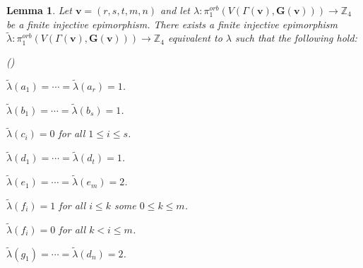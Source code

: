 \documentclass{amsart}
\newcounter{qcounter}
\newtheorem{lemma}[theorem]{Lemma}
\theoremstyle{definition}
\numberwithin{equation}{section}
\begin{document}
\begin{lemma}
Let ${\mathbf{v}}=(r,s,t,m,n)$ and let $\lambda:\pi_1^{orb}(V(\Gamma({\mathbf{v}}), {\mathbf{G(v)}}))\longrightarrow{\mathbb{Z}_{4}}$ be a finite injective epimorphism. There exists a finite injective epimorphism $\tilde{\lambda}:\pi_1^{orb}(V(\Gamma({\mathbf{v}}), {\mathbf{G(v)}}))\longrightarrow{\mathbb{Z}_{4}}$ equivalent to $\lambda$ such that the following hold:
\begin{list}{()~}{}
\item $\tilde{\lambda}(a_{1})=\cdots=\tilde{\lambda}(a_{r})=1$.
\item $\tilde{\lambda}(b_{1})=\cdots=\tilde{\lambda}(b_{s})=1$.
\item $\tilde{\lambda}(c_i)=0$ for all $1\leq{i}\leq{s}$.
\item $\tilde{\lambda}(d_{1})=\cdots=\tilde{\lambda}(d_{t})=1$.
\item $\tilde{\lambda}(e_{1})=\cdots=\tilde{\lambda}(e_{m})={2}$.
\item $\tilde{\lambda}(f_i)=1$ for all $i\leq{k}$ some $0\leq{k}\leq{m}$.
\item $\tilde{\lambda}(f_i)=0$ for all $k<{i}\leq{m}$.
\item $\tilde{\lambda}(g_{1})=\cdots=\tilde{\lambda}(d_{n})=2$.
\end{list}
\end{lemma}
\end{document}
